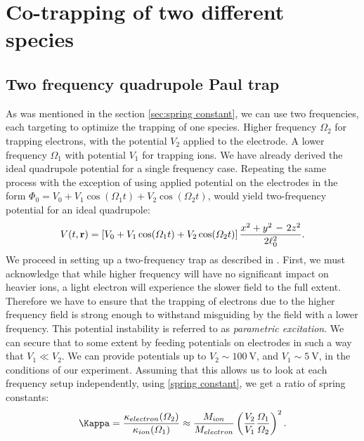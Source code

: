 \chapter{Co-trapping of two different species}
\label{chap:co-trapping}

\section{Two frequency quadrupole Paul trap}
\label{sec:two frequency trap}
As was mentioned in the section \ref{sec:spring constant},
we can use two frequencies, each targeting to optimize the trapping of one species. Higher frequency $\Omega_2$ for trapping electrons, with the potential $V_2$ applied to the electrode. A lower frequency $\Omega_1$ with potential $V_1$ for trapping ions. We have already derived the ideal quadrupole potential for a single frequency case. Repeating the same process with the exception of using applied potential on the electrodes in the form $\Phi_0 = V_0 + V_1 \cos(\Omega_1 t) + V_2 \cos(\Omega_2 t)$, would yield two-frequency potential for an ideal quadrupole:
\begin{equation}
	\label{ideal quadrupole potential two frequency}
	V(t,\vb{r}) = \left[V_0 + V_1 \cos(\Omega_1 t) + V_2 \cos(\Omega_2 t)\right] \dfrac{x^2+y^2 \minus 2z^2}{2\ell_0^2}.
\end{equation}
We proceed in setting up a two-frequency trap as described in \cite{FOOT2018117, trypogeorgos2016cotrapping}. First, we must acknowledge that while higher frequency will have no significant impact on heavier ions, a light electron will experience the slower field to the full extent. Therefore we have to ensure that the trapping of electrons due to the higher frequency field is strong enough to withstand misguiding by the field with a lower frequency. This potential instability is referred to as \emph{parametric excitation}. We can secure that to some extent by feeding potentials on electrodes in such a way that $V_1 \ll V_2$. We can provide potentials up to $V_2 \sim \SI{100}{\volt}$, and $V_1 \sim \SI{5}{\volt}$, in the conditions of our experiment. Assuming that this allows us to look at each frequency setup independently, using \eqref{spring constant}, we get a ratio of spring constants:
\begin{equation}
	\label{two frequency ratio}
	\Kappa = \dfrac{\kappa_{electron}(\Omega_2)}{\kappa_{ion}(\Omega_1)} \approx \dfrac{M_{ion}}{M_{electron}} \left(\dfrac{V_2}{V_1}\dfrac{\Omega_1}{\Omega_2}\right)^2.
\end{equation}
